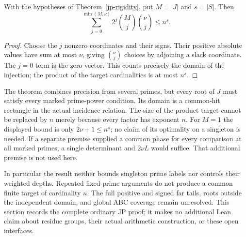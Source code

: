 \begin{corollary}
\label{jp-capacity}
With the hypotheses of Theorem~\ref{jp-rigidity}, put
\(M=|J|\) and \(s=|S|\). Then
\[
 \sum_{j=0}^{\min(M,\nu)}
       2^j\binom{M}{j}\binom{\nu}{j}\le n^s.
\]
\end{corollary}
\begin{proof}
Choose the \(j\) nonzero coordinates and their signs. Their positive
absolute values have sum at most \(\nu\), giving \(\binom{\nu}{j}\)
choices by adjoining a slack coordinate. The \(j=0\) term is the zero
vector. This counts precisely the domain of the injection; the product
of the target cardinalities is at most \(n^s\).
\end{proof}

The theorem combines precision from several primes, but every root of
\(J\) must satisfy every marked prime-power condition. Its domain is a
common-hit rectangle in the actual incidence relation. The size of the
product target cannot be replaced by \(n\) merely because every factor
has exponent \(n\). For \(M=1\) the displayed bound is only
\(2\nu+1\le n^s\); no claim of its optimality on a singleton is needed.
If a separate premise supplied a common phase for every comparison at
all marked primes, a single determinant and \(2\nu L\) would suffice.
That additional premise is not used here.

In particular the result neither bounds singleton prime labels nor
controls their weighted depths. Repeated fixed-prime arguments do not
produce a common finite target of cardinality \(n\). The full positive
and signed far tails, roots outside the independent domain, and global
ABC coverage remain unresolved. This section records the complete
ordinary JP proof; it makes no additional Lean claim about residue
groups, their actual arithmetic construction, or these open interfaces.

